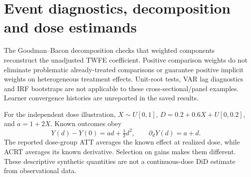 \section{Event diagnostics, decomposition and dose estimands}




The Goodman--Bacon decomposition checks that weighted components reconstruct the unadjusted TWFE coefficient. Positive comparison weights do not eliminate problematic already-treated comparisons or guarantee positive implicit weights on heterogeneous treatment effects. Unit-root tests, VAR lag diagnostics and IRF bootstraps are not applicable to these cross-sectional/panel examples. Learner convergence histories are unreported in the saved results.

For the independent dose illustration, $X\sim U[0,1]$, $D=0.2+0.6X+U[0,0.2]$, and $a=1+2X$. Known outcomes obey
\begin{equation}
 Y(d)-Y(0)=ad+\tfrac12 d^2,\qquad \partial_dY(d)=a+d.
\end{equation}
The reported dose-group ATT averages the known effect at realized dose, while ACRT averages its known derivative. Selection on gains makes them different. These descriptive synthetic quantities are not a continuous-dose DiD estimate from observational data.

\endgroup
